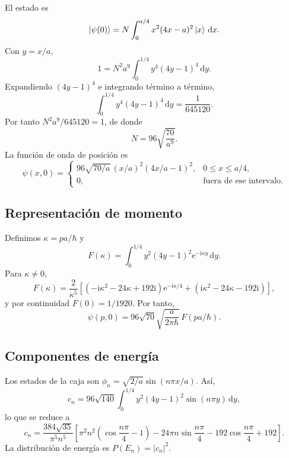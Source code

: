 \documentclass[11pt,a4paper]{article}
\numberwithin{equation}{section}
\renewcommand{\boxed}[1]{#1}
\newcommand{\dd}{\,\mathrm d}
\newcommand{\ii}{\mathrm i}
\newcommand{\e}{\mathrm e}
\newcommand{\hb}{\hbar}
\begin{document}
El estado es
\begin{equation}
\ket{\psi(0)}=N\int_0^{a/4}x^2(4x-a)^2\ket x\dd x.
\end{equation}
Con $y=x/a$,
\begin{equation}
1=N^2a^9\int_0^{1/4}y^4(4y-1)^4\dd y.
\end{equation}
Expandiendo $(4y-1)^4$ e integrando término a término,
\begin{equation}
\int_0^{1/4}y^4(4y-1)^4\,\mathrm dy=\frac{1}{645120}.
\end{equation}
Por tanto $N^2a^9/645120=1$, de donde
\begin{equation}
\boxed{N=96\sqrt{\frac{70}{a^9}}.}
\end{equation}
La función de onda de posición es
\begin{equation}
\boxed{\psi(x,0)=\begin{cases}
96\sqrt{70/a}\,(x/a)^2(4x/a-1)^2,&0\le x\le a/4,\\
0,&\text{fuera de ese intervalo}.
\end{cases}}
\end{equation}

\subsection{Representación de momento}
Definimos $\kappa=pa/\hb$ y
\begin{equation}
F(\kappa)=\int_0^{1/4}y^2(4y-1)^2\e^{-\ii\kappa y}\dd y.
\end{equation}
Para $\kappa\neq0$,
\begin{equation}
F(\kappa)=\frac{2}{\kappa^5}\left[
(-\ii\kappa^2-24\kappa+192\ii)\e^{-\ii\kappa/4}
+(\ii\kappa^2-24\kappa-192\ii)\right],
\end{equation}
y por continuidad $F(0)=1/1920$. Por tanto,
\begin{equation}
\boxed{\psi(p,0)=96\sqrt{70}\sqrt{\frac{a}{2\pi\hb}}\,F(pa/\hb).}
\end{equation}

\subsection{Componentes de energía}
Los estados de la caja son $\phi_n=\sqrt{2/a}\sin(n\pi x/a)$. Así,
\begin{equation}
c_n=96\sqrt{140}\int_0^{1/4}y^2(4y-1)^2\sin(n\pi y)\dd y,
\end{equation}
lo que se reduce a
\begin{equation}
\boxed{c_n=\frac{384\sqrt{35}}{\pi^5n^5}
\left[\pi^2n^2\left(\cos\frac{n\pi}{4}-1\right)
-24\pi n\sin\frac{n\pi}{4}-192\cos\frac{n\pi}{4}+192\right].}
\end{equation}
La distribución de energía es $P(E_n)=|c_n|^2$.
\end{document}
